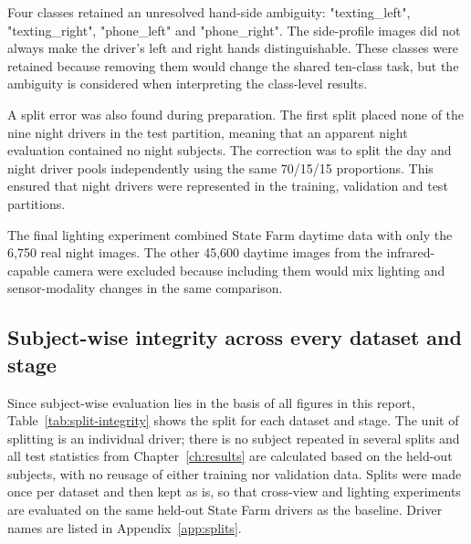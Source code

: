 Four classes retained an unresolved hand-side ambiguity: "texting\_left", "texting\_right", "phone\_left" and "phone\_right". The side-profile images did not always make the driver's left and right hands distinguishable. These classes were retained because removing them would change the shared ten-class task, but the ambiguity is considered when interpreting the class-level results.

A split error was also found during preparation. The first split placed none of the nine night drivers in the test partition, meaning that an apparent night evaluation contained no night subjects. The correction was to split the day and night driver pools independently using the same 70/15/15 proportions. This ensured that night drivers were represented in the training, validation and test partitions.

The final lighting experiment combined State Farm daytime data with only the 6,750 real night images. The other 45,600 daytime images from the infrared-capable camera were excluded because including them would mix lighting and sensor-modality changes in the same comparison.

\subsection{Subject-wise integrity across every dataset and stage}
\label{sec:method-split-integrity}

Since subject-wise evaluation lies in the basis of all figures in this report, Table~\ref{tab:split-integrity} shows the split for each dataset and stage. The unit of splitting is an individual driver; there is no subject repeated in several splits and all test statistics from Chapter~\ref{ch:results} are calculated based on the held-out subjects, with no reusage of either training nor validation data. Splits were made once per dataset and then kept as is, so that cross-view and lighting experiments are evaluated on the same held-out State Farm drivers as the baseline. Driver names are listed in Appendix~\ref{app:splits}.

